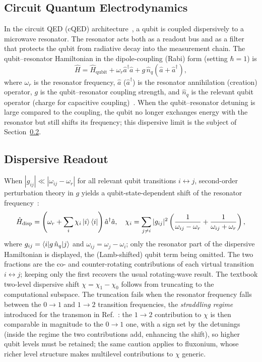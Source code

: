 \subsection{Circuit Quantum Electrodynamics}

In the circuit QED (cQED) architecture~\cite{Blais2004}, a qubit is coupled
dispersively to a microwave resonator.  The resonator acts both as a readout bus
and as a filter that protects the qubit from radiative decay into the measurement
chain.  The qubit--resonator Hamiltonian in the dipole-coupling (Rabi) form
(setting $\hbar=1$) is
\begin{equation}
  \hat{H} = \hat{H}_\text{qubit}
           + \omega_r \hat{a}^\dagger \hat{a}
           + g\,\hat{n}_q (\hat{a} + \hat{a}^\dagger),
\label{eq:rabi_cqed}
\end{equation}
where $\omega_r$ is the resonator frequency, $\hat{a}$ ($\hat{a}^\dagger$) is the
resonator annihilation (creation) operator, $g$ is the qubit--resonator coupling
strength, and $\hat{n}_q$ is the relevant qubit operator (charge for capacitive
coupling)~\cite{Krantz2019}.  When the qubit--resonator detuning is large compared
to the coupling, the qubit no longer exchanges energy with the resonator but still
shifts its frequency; this dispersive limit is the subject of
Section~\ref{subsec:dispersive}.

\subsection{Dispersive Readout}
\label{subsec:dispersive}

When $|g_{ij}| \ll |\omega_{ij} - \omega_r|$ for all relevant qubit transitions
$i \leftrightarrow j$, second-order perturbation theory in $g$ yields a
qubit-state-dependent shift of the resonator frequency~\cite{Blais2021}:
\begin{equation}
  \hat{H}_\text{disp} = \left(\omega_r + \sum_i \chi_i \ket{i}\bra{i}\right)
  \hat{a}^\dagger \hat{a},
  \quad
  \chi_i = \sum_{j \neq i} |g_{ij}|^2
  \left(\frac{1}{\omega_{ij} - \omega_r} + \frac{1}{\omega_{ij} + \omega_r}\right),
  \label{eq:dispersive_shift}
\end{equation}
where $g_{ij} = \braket{i|g\,\hat{n}_q|j}$ and $\omega_{ij} = \omega_j -
  \omega_i$; only the resonator part of the dispersive Hamiltonian is displayed,
  the (Lamb-shifted) qubit term being omitted.  The two fractions are the co- and
  counter-rotating contributions of
  each virtual transition $i \leftrightarrow j$; keeping only the first recovers the
  usual rotating-wave result.  The textbook two-level dispersive shift $\chi = \chi_1 - \chi_0$
follows from truncating to the computational subspace.  The truncation fails when
the resonator frequency falls between the $0\!\to\!1$ and $1\!\to\!2$ transition
frequencies, the \emph{straddling regime} introduced for the transmon in
Ref.~\cite{Koch2007}: the $1\!\to\!2$ contribution to $\chi$ is then comparable in
magnitude to the $0\!\to\!1$ one, with a sign set by the detunings (inside the
regime the two contributions add, enhancing the shift), so higher qubit levels
must be retained; the same caution applies to fluxonium, whose richer level
structure makes multilevel contributions to $\chi$ generic.

